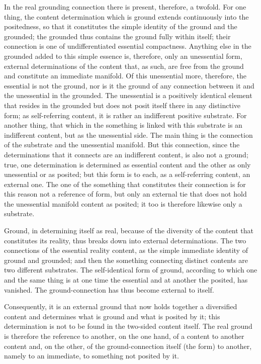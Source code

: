 In the real grounding connection
there is present, therefore, a twofold.
For one thing, the content determination which is ground
extends continuously into the positedness,
so that it constitutes the simple identity
of the ground and the grounded;
the grounded thus contains the ground
fully within itself;
their connection is one of
undifferentiated essential compactness.
Anything else in the grounded
added to this simple essence is,
therefore, only an unessential form,
external determinations of the content
that, as such, are free from the ground
and constitute an immediate manifold.
Of this unessential more, therefore,
the essential is not the ground,
nor is it the ground of any connection
between it and the unessential in the grounded.
The unessential is a positively identical element
that resides in the grounded but does not posit itself
there in any distinctive form;
as self-referring content, it is rather
an indifferent positive substrate.
For another thing, that which in the something is
linked with this substrate is an indifferent content,
but as the unessential side.
The main thing is the connection of the substrate
and the unessential manifold.
But this connection, since the determinations
that it connects are an indifferent content,
is also not a ground;
true, one determination is determined as essential content
and the other as only unessential or as posited;
but this form is to each, as a self-referring content, an external one.
The one of the something that constitutes their connection is
for this reason not a reference of form,
but only an external tie that does not hold
the unessential manifold content as posited;
it too is therefore likewise only a substrate.

Ground, in determining itself as real,
because of the diversity of the content
that constitutes its reality,
thus breaks down into external determinations.
The two connections of the essential reality content,
as the simple immediate identity of ground and grounded;
and then the something connecting distinct contents
are two different substrates.
The self-identical form of ground,
according to which one and the same thing
is at one time the essential
and at another the posited, has vanished.
The ground-connection has thus become external to itself.

Consequently, it is an external ground that now
holds together a diversified content
and determines what is ground and what is posited by it;
this determination is not to be found in the two-sided content itself.
The real ground is therefore the reference to another,
on the one hand, of a content to another content
and, on the other, of the ground-connection itself
(the form) to another, namely to an immediate,
to something not posited by it.

